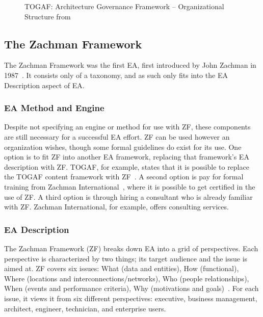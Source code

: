 \begin{figure}
\centering
\caption{TOGAF: Architecture Governance Framework -- Organizational Structure from \cite[Sec. 50.2.2.1]{togaf9.1}}
\label{fig:togaf_govStructure}
\end{figure}

\subsection{The Zachman Framework}

The Zachman Framework was the first EA, first introduced by John Zachman in 1987~\cite{sessions2007,zachman}. It consists only of a taxonomy, and as such only fits into the EA Description aspect of EA. 

\subsubsection{EA Method and Engine}

Despite not specifying an engine or method for use with ZF, these components are still necessary for a successful EA effort. ZF can be used however an organization wishes, though some formal guidelines do exist for its use. One option is to fit ZF into another EA framework, replacing that framework's EA description with ZF. TOGAF, for example, states that it is possible to replace the TOGAF content framework with ZF~\cite[Ch. 33]{togaf9.1}. A second option is pay for formal training from Zachman International~\cite{zachmanInc}, where it is possible to get certified in the use of ZF. A third option is through hiring a consultant who is already familiar with ZF. Zachman International, for example, offers consulting services.

\subsubsection{EA Description}

The Zachman Framework (ZF) breaks down EA into a grid of perspectives. Each perspective is characterized by two things; its target audience and the issue is aimed at. ZF covers six issues: What (data and entities), How (functional), Where (locations and interconnections/networks), Who (people relationships), When (events and performance criteria), Why (motivations and goals)~\cite{jungle2004}. For each issue, it views it from six different perspectives: executive, business management, architect, engineer, technician, and enterprise users. 

